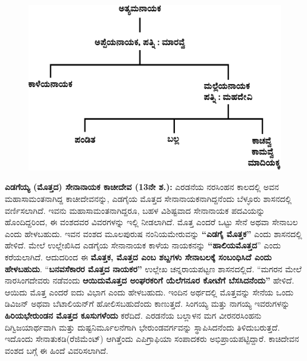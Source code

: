 \begin{figure}[H]
\includegraphics[scale=1.2]{images/chap3/chap3fig29.jpeg}
\end{figure}

\textbf{ಎಡಗೆಯ್ಯ (ಮೊತ್ತದ) ಸೇನಾನಾಯಕ ಕಾಚೀದೇವ (13ನೇ ಶ.):} ಎರಡನೆಯ ನರಸಿಂಹನ ಕಾಲದಲ್ಲಿ ಅವನ ಮಹಾಸಾಮಂತ\-ನಾಗಿದ್ದ ಕಾಚೀದೇವನನ್ನು, ಎಡಗೈಯ ಮೊತ್ತದ ಸೇನಾನಾಯಕನಾಗಿದ್ದನೆಂದು ಬೆಳ್ಳೂರು ಶಾಸನದಲ್ಲಿ ವರ್ಣಿಸ\-ಲಾಗಿದೆ. ಇವನು ಮಹಾಸಾಮಂತನಾಗಿದ್ದರೂ, ಬಹಳ ವಿಶಿಷ್ಟವಾದ ಸೇನಾನಾಯಕ ಪದವಿಯನ್ನು ಹೊಂದಿದ್ದರಿಂದ, ಈ ವಂಶದವರ ವಿವರಗಳನ್ನು ಇಲ್ಲಿ ನೀಡಲಾಗಿದೆ. ಮೊತ್ತ ಎಂದರೆ ಒಟ್ಟು ಸೇನೆ ಅಥವಾ ಸೇನಾಬಲ ಎಂದು ಹೇಳಬಹುದು. ಇವನ ವಂಶದ ಮೂಲಪುರುಷ ನಂನಿಯಮೇರುವನ್ನು \textbf{“ಎಡಗೈ ಮೊತ್ತಕ”} ಎಂದು ಶಾಸನದಲ್ಲಿ ಹೇಳಿದೆ. ಮೇಲೆ ಉಲ್ಲೇಖಿಸಿದ ಎಡಗೈಯ ಸೇನಾನಾಯಕ ಕಾಳೆಯ ನಾಯಕನನ್ನು \textbf{“ಹಾಲಿಯಮೊತ್ತದ}” ಎಂದು ಕರೆಯಲಾಗಿದೆ. ಆದುದರಿಂದ ಈ \textbf{ಮೊತ್ತಕ, ಮೊತ್ತದ ಎಂಬ ಶಬ್ದಗಳು ಸೇನಾಬಲಕ್ಕೆ ಸಂಬಂಧಿಸಿದೆ ಎಂದು ಹೇಳಬಹುದು}. “\textbf{ಬನವಸೆಕಾರರ ಮೊತ್ತದ ನಾಯಕರ”} ಉಲ್ಲೇಖ ಚನ್ನರಾಯಪಟ್ಟಣ ಶಾಸನದಲ್ಲಿದೆ. “ಮಗರನ ಮೇಲೆ ನಾರಸಿಂಗದೇವರು ನಡೆವಂದು \textbf{ಆಯಿದುಮೊತ್ತದ ಅಂಘರಕರಿಗೆ ಯೆಲೆಗನೂರ ಕೋಟೆಗೆ ಬೆಸಸಿದನೆಂದು”} ಹೇಳಿದೆ. ಆಯಿದು ಮೊತ್ತ ಎಂದರೆ ಐದು ವಿಭಾಗ ಎಂದು ಹೇಳಬಹುದು. ಇಂದಿನ ಅರ್ಥದಲ್ಲಿ ಮೊತ್ತವನ್ನು ಸೇನೆಯ ಒಂದು ಡಿವಿಜನ್​ ಅಥವಾ ಬೆಟಾಲಿಯನ್​ಗೆ ಹೋಲಿಸಬಹುದೆಂದು ಕಾಣುತ್ತದೆ. ಸಿಂಗಯ್ಯ ಮತ್ತು ನಾಗಯ್ಯ ಇವರುಗಳನ್ನು \textbf{ಹಿರಿಯಭೇರುಂಡನ ಮೊತ್ತದ ಕೂಸುಗಳೆಂದು} ಕರೆದಿದೆ. ಎರಡನೆಯ ಬಲ್ಲಾಳನ ಮಗ ವೀರನರಸಿಂಹನು ದಿಗ್ವಿಜಯಾರ್ಥವಾಗಿ ಮತ್ತು ದುಷ್ಟನಿರ್ಮೂಲನೆಗಾಗಿ ಭೇರುಂಡವರ್ಗವನ್ನು ಸ್ಥಾಪಿಸಿದನೆಂದು ತಿಳಿದುಬರುತ್ತದೆ. ಇದೊಂದು ಸೇನಾತುಕಡಿ(ರೆಜಿಮೆಂಟ್​) ಆಗಿತ್ತೆಂದು ಎಪಿಗ್ರಾಫಿಯಾ ಸಂಪಾದಕರು ಅಭಿಪ್ರಾಯಪಟ್ಟಿದ್ದಾರೆ. ಕಾಚಿದೇವನ ವಂಶದ ಬಗ್ಗೆ ಈ ಹಿಂದೆ ವಿವರಿಸಲಾಗಿದೆ.


